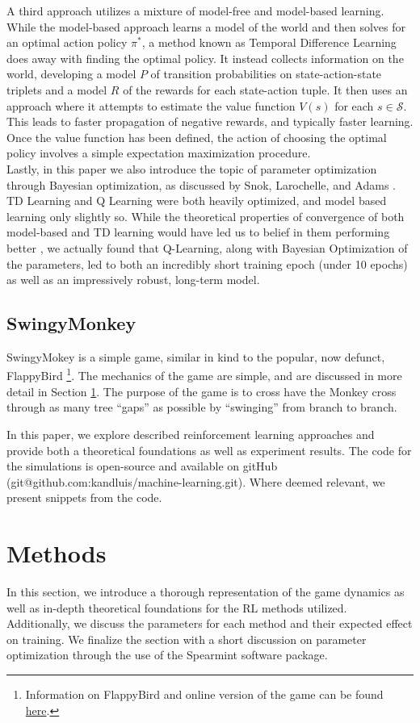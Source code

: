 \documentclass[letterpaper]{article}
\begin{document}
A third approach utilizes a mixture of model-free and model-based learning. While the model-based approach learns a model of the world and then solves for an optimal action policy $\pi^*$, a method known as Temporal Difference Learning does away with finding the optimal policy. It instead collects information on the world, developing a model $P$ of transition probabilities on state-action-state triplets and a model $R$ of the rewards for each state-action tuple. It then uses an approach where it attempts to estimate the value function $V(s)$ for each $s \in \mathcal{S}$. This leads to faster propagation of negative rewards, and typically faster learning. Once the value function has been defined, the action of choosing the optimal policy involves a simple expectation maximization procedure.
\\
Lastly, in this paper we also introduce the topic of parameter optimization through Bayesian optimization, as discussed by Snok, Larochelle, and Adams \cite{bayes}. TD Learning and Q Learning were both heavily optimized, and model based learning only slightly so. While the theoretical properties of convergence of both model-based and TD learning would have led us to belief in them performing better , we actually found that Q-Learning, along with Bayesian Optimization of the parameters, led to both an incredibly short training epoch (under 10 epochs) as well as an impressively robust, long-term model.

\subsection{SwingyMonkey}
SwingyMokey is a simple game, similar in kind to the popular, now defunct, FlappyBird \footnote{Information on FlappyBird and online version of the game can be found \href{http://flappybird.io/}{here}.}. The mechanics of the game are simple, and are discussed in more detail in Section \ref{sec:methods}. The purpose of the game is to cross have the Monkey cross through as many tree ``gaps'' as possible by ``swinging'' from branch to branch.

In this paper, we explore described reinforcement learning approaches and provide both a theoretical foundations as well as experiment results. The code for the simulations is open-source and available on gitHub (git@github.com:kandluis/machine-learning.git). Where deemed relevant, we present snippets from the code.

\section{Methods}
\label{sec:methods}
In this section, we introduce a thorough representation of the game dynamics as well as in-depth theoretical foundations for the RL methods utilized. Additionally, we discuss the parameters for each method and their expected effect on training. We finalize the section with a short discussion on parameter optimization through the use of the Spearmint software package.
\end{document}
